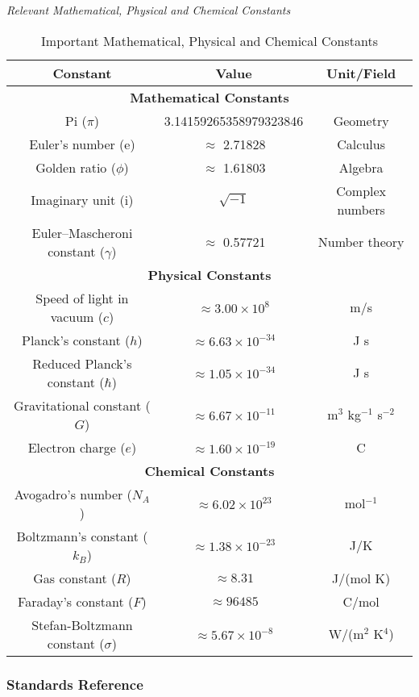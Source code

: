 \emph{Relevant Mathematical, Physical and Chemical Constants}

\begin{table}[ht]
  \centering
  \begin{tabular}{|c|c|c|}
  \hline
  \textbf{Constant} & \textbf{Value} & \textbf{Unit/Field} \\
  \hline
  \multicolumn{3}{|c|}{\textbf{Mathematical Constants}} \\
  \hline
  Pi ($\pi$) & 3.14159265358979323846 & Geometry \\
  Euler's number (e) & $\approx$ 2.71828 & Calculus \\
  Golden ratio ($\phi$) & $\approx$ 1.61803 & Algebra \\
  Imaginary unit (i) & $\sqrt{-1}$ & Complex numbers \\
  Euler–Mascheroni constant ($\gamma$) & $\approx$ 0.57721 & Number theory \\
  \hline
  \multicolumn{3}{|c|}{\textbf{Physical Constants}} \\
  \hline
  Speed of light in vacuum ($c$) & $\approx 3.00 \times 10^{8}$ & m/s \\
  Planck's constant ($h$) & $\approx 6.63 \times 10^{-34}$ & J s \\
  Reduced Planck's constant ($\hbar$) & $\approx 1.05 \times 10^{-34}$ & J s \\
  Gravitational constant ($G$) & $\approx 6.67 \times 10^{-11}$ & m$^3$ kg$^{-1}$ s$^{-2}$ \\
  Electron charge ($e$) & $\approx 1.60 \times 10^{-19}$ & C \\
  \hline
  \multicolumn{3}{|c|}{\textbf{Chemical Constants}} \\
  \hline
  Avogadro's number ($N_A$) & $\approx 6.02 \times 10^{23}$ & mol$^{-1}$ \\
  Boltzmann's constant ($k_B$) & $\approx 1.38 \times 10^{-23}$ & J/K \\
  Gas constant ($R$) & $\approx 8.31$ & J/(mol K) \\
  Faraday's constant ($F$) & $\approx 96485$ & C/mol \\
  Stefan-Boltzmann constant ($\sigma$) & $\approx 5.67 \times 10^{-8}$ & W/(m$^2$ K$^4$) \\
  \hline
  \end{tabular}
  \caption{Important Mathematical, Physical and Chemical Constants}
  \label{table:constants}
  \end{table}

\newpage
\subsubsection{Standards Reference}


